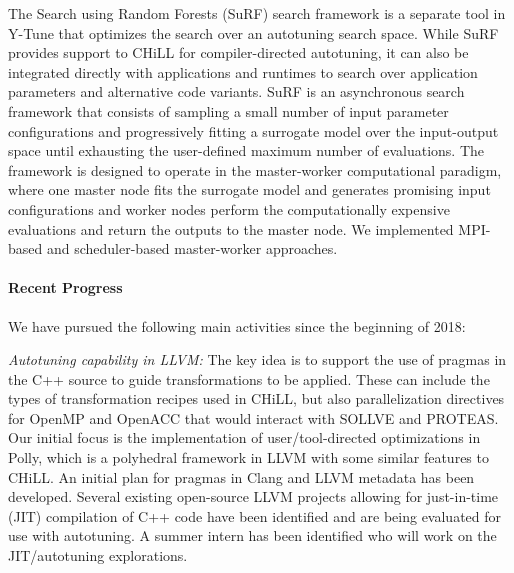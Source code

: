 The Search using Random Forests (SuRF) search framework is a separate tool in Y-Tune that optimizes the search over an autotuning search space.  While
SuRF provides support to CHiLL for compiler-directed autotuning, it can
also be integrated directly with applications and runtimes to search over
application parameters and alternative code variants.
SuRF is an asynchronous search framework that consists of sampling a small number of input parameter configurations and progressively fitting a surrogate model over the input-output space until exhausting the user-defined maximum number of evaluations. The framework is designed to operate in the master-worker computational paradigm, where one master node fits the surrogate model and generates promising input configurations and worker nodes perform the computationally expensive evaluations and return the outputs to the master node. We implemented MPI-based and scheduler-based master-worker approaches.


\paragraph{Recent Progress}


We have pursued the following main activities since the beginning of 2018:

\textit{Autotuning capability in LLVM:}
The key idea is to support the use of pragmas in the C++ source to guide transformations to be applied. These can include the types of transformation recipes used in CHiLL, but also parallelization directives for OpenMP and OpenACC that would interact with SOLLVE and PROTEAS. Our initial focus is the implementation of user/tool-directed optimizations in Polly, which is a polyhedral framework in LLVM with some similar features to CHiLL. An initial plan for pragmas in Clang and LLVM metadata has been developed. Several existing open-source LLVM projects allowing for just-in-time (JIT) compilation of C++ code have been identified and are being evaluated for use with autotuning. A summer intern has been identified who will work on the JIT/autotuning explorations.



